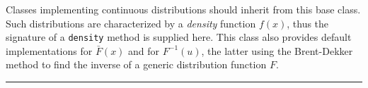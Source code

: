 
Classes implementing continuous distributions should inherit from this base
 class.
Such distributions are characterized by a \emph{density} function $f(x)$,
thus the signature of a \texttt{density} method is supplied here.
This class also provides default implementations for $\bar F(x)$
and for $F^{-1}(u)$, the latter using the Brent-Dekker method to find the inverse
of a generic distribution function $F$. %


\bigskip\hrule

